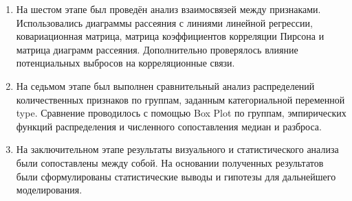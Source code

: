 \begin{enumerate}
    \item На шестом этапе был проведён анализ взаимосвязей между признаками. Использовались диаграммы рассеяния с линиями линейной регрессии, ковариационная матрица, матрица коэффициентов корреляции Пирсона и матрица диаграмм рассеяния. Дополнительно проверялось влияние потенциальных выбросов на корреляционные связи.
    
    \item На седьмом этапе был выполнен сравнительный анализ распределений количественных признаков по группам, заданным категориальной переменной type. Сравнение проводилось с помощью Box Plot по группам, эмпирических функций распределения и численного сопоставления медиан и разброса.
    
    \item На заключительном этапе результаты визуального и статистического анализа были сопоставлены между собой. На основании полученных результатов были сформулированы статистические выводы и гипотезы для дальнейшего моделирования.
\end{enumerate}
